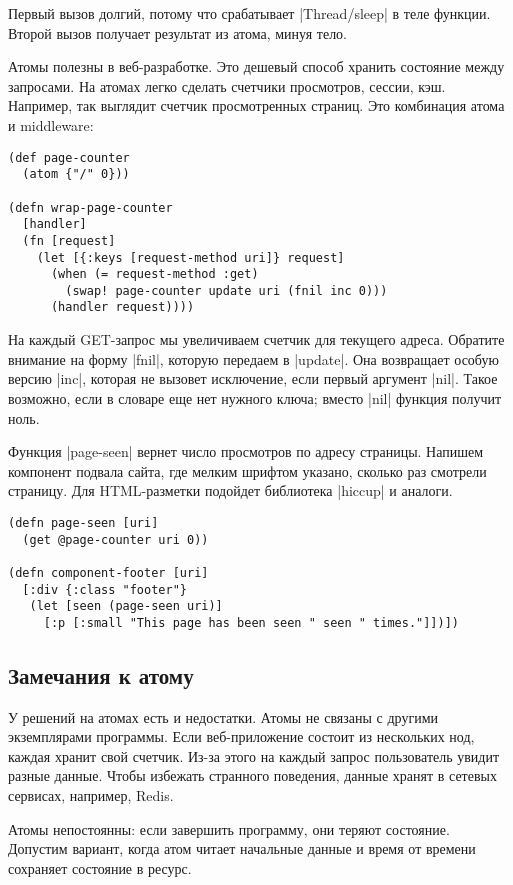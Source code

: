 Первый вызов долгий, потому что срабатывает \spverb|Thread/sleep| в теле
функции. Второй вызов получает результат из атома, минуя тело.

Атомы полезны в веб-разработке. Это дешевый способ хранить состояние между
запросами. На атомах легко сделать счетчики просмотров, сессии, кэш. Например,
так выглядит счетчик просмотренных страниц. Это комбинация атома и middleware:

\begin{verbatim}
(def page-counter
  (atom {"/" 0}))

(defn wrap-page-counter
  [handler]
  (fn [request]
    (let [{:keys [request-method uri]} request]
      (when (= request-method :get)
        (swap! page-counter update uri (fnil inc 0)))
      (handler request))))
\end{verbatim}

На каждый GET-запрос мы увеличиваем счетчик для текущего адреса. Обратите
внимание на форму \spverb|fnil|, которую передаем в \spverb|update|. Она
возвращает особую версию \spverb|inc|, которая не вызовет исключение, если
первый аргумент \spverb|nil|. Такое возможно, если в словаре еще нет нужного
ключа; вместо \spverb|nil| функция получит ноль.

Функция \spverb|page-seen| вернет число просмотров по адресу страницы. Напишем
компонент подвала сайта, где мелким шрифтом указано, сколько раз смотрели
страницу. Для HTML-разметки подойдет библиотека
\spverb|hiccup| и аналоги.

\begin{verbatim}
(defn page-seen [uri]
  (get @page-counter uri 0))

(defn component-footer [uri]
  [:div {:class "footer"}
   (let [seen (page-seen uri)]
     [:p [:small "This page has been seen " seen " times."]])])
\end{verbatim}

\subsection{Замечания к атому}

У решений на атомах есть и недостатки. Атомы не связаны с другими экземплярами
программы. Если веб-приложение состоит из нескольких нод, каждая хранит свой
счетчик. Из-за этого на каждый запрос пользователь увидит разные данные. Чтобы
избежать странного поведения, данные хранят в сетевых сервисах, например, Redis.

Атомы непостоянны: если завершить программу, они теряют состояние. Допустим
вариант, когда атом читает начальные данные и время от времени сохраняет
состояние в ресурс.

